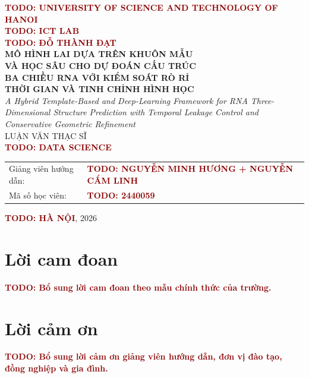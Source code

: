 \documentclass[12pt,a4paper,oneside]{report}
\newcommand{\TODO}[1]{\textcolor{darkred}{\textbf{TODO: #1}}}
\begin{document}
\begin{titlepage}
\begin{center}
  {\large \TODO{UNIVERSITY OF SCIENCE AND TECHNOLOGY OF HANOI}}\\[0.3cm]
  {\large \TODO{ICT LAB}}\\[2.0cm]

  {\Large\bfseries \TODO{ĐỖ THÀNH ĐẠT}}\\[1.5cm]

  {\LARGE\bfseries
  MÔ HÌNH LAI DỰA TRÊN KHUÔN MẪU\\
  VÀ HỌC SÂU CHO DỰ ĐOÁN CẤU TRÚC\\
  BA CHIỀU RNA VỚI KIỂM SOÁT RÒ RỈ\\
  THỜI GIAN VÀ TINH CHỈNH HÌNH HỌC
  }\\[1.0cm]

  {\large\itshape
  A Hybrid Template-Based and Deep-Learning Framework for RNA Three-Dimensional
  Structure Prediction with Temporal Leakage Control and Conservative Geometric Refinement
  }\\[1.5cm]

  {\large LUẬN VĂN THẠC SĨ}\\[0.4cm]
  {\large \TODO{DATA SCIENCE}}\\[1.6cm]

  \begin{tabular}{ll}
  Giảng viên hướng dẫn: & \TODO{NGUYỄN MINH HƯƠNG + NGUYỄN CẨM LINH}\\
  Mã số học viên:       & \TODO{2440059}
  \end{tabular}

  \vfill
  {\large \TODO{HÀ NỘI}, 2026}
\end{center}
\end{titlepage}


\chapter*{Lời cam đoan}
\TODO{Bổ sung lời cam đoan theo mẫu chính thức của trường.}

\chapter*{Lời cảm ơn}
\TODO{Bổ sung lời cảm ơn giảng viên hướng dẫn, đơn vị đào tạo, đồng nghiệp và gia đình.}
\end{document}
